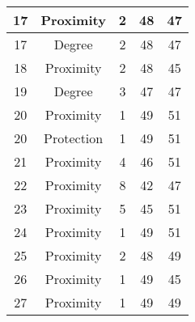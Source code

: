 \documentclass[results.tex]{subfiles}
\begin{document}
\begin{center}
\begin{tabular}{| c || c | c | c | c |}
            \hline
            17                      & Proximity                    & 2                      & 48                      & 47                   \\
            \hline
            17                      & Degree                       & 2                      & 48                      & 47                   \\
            \hline
            18                      & Proximity                    & 2                      & 48                      & 45                   \\
            \hline
            19                      & Degree                       & 3                      & 47                      & 47                   \\
            \hline
            20                      & Proximity                    & 1                      & 49                      & 51                   \\
            \hline
            20                      & Protection                   & 1                      & 49                      & 51                   \\
            \hline
            21                      & Proximity                    & 4                      & 46                      & 51                   \\
            \hline
            22                      & Proximity                    & 8                      & 42                      & 47                   \\
            \hline
            23                      & Proximity                    & 5                      & 45                      & 51                   \\
            \hline
            24                      & Proximity                    & 1                      & 49                      & 51                   \\
            \hline
            25                      & Proximity                    & 2                      & 48                      & 49                   \\
            \hline
            26                      & Proximity                    & 1                      & 49                      & 45                   \\
            \hline
            27                      & Proximity                    & 1                      & 49                      & 49                   \\

\end{tabular}
\end{center}
\end{document}
